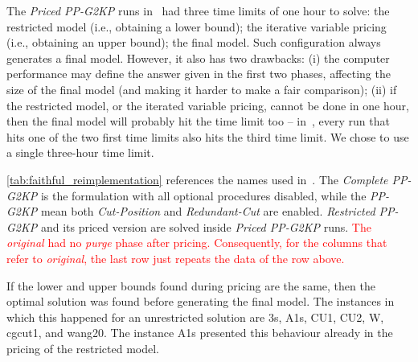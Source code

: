 \documentclass[smallextended]{svjour3}       %
\newif\iffinalversion
\newcommand{\oldtext}[1]{\iffinalversion%
#1%
\else%
\textcolor{red}{#1}%
\fi%
}
\begin{document}
The \emph{Priced PP-G2KP} runs in~\cite{furini:2016,dimitri_thesis} had three time limits of one hour to solve: the restricted model (i.e., obtaining a lower bound); the iterative variable pricing (i.e., obtaining an upper bound); the final model.
Such configuration always generates a final model.
However, it also has two drawbacks:
(i) the computer performance may define the answer given in the first two phases, affecting the size of the final model (and making it harder to make a fair comparison);
(ii) if the restricted model, or the iterated variable pricing, cannot be done in one hour, then the final model will probably hit the time limit too -- in~\cite{furini:2016}, every run that hits one of the two first time limits also hits the third time limit.
We chose to use a single three-hour time limit.

\autoref{tab:faithful_reimplementation} references the names used in~\cite{furini:2016,dimitri_thesis}.
The \emph{Complete PP-G2KP} is the formulation with all optional procedures disabled, while the \emph{PP-G2KP} mean both \emph{Cut-Position} and \emph{Redundant-Cut} are enabled.
\emph{Restricted PP-G2KP} and its priced version are solved inside \emph{Priced PP-G2KP} runs. \oldtext{The \emph{original} had no \emph{purge} phase after pricing. Consequently, for the columns that refer to \emph{original}, the last row just repeats the data of the row above.}
If the lower and upper bounds found during pricing are the same, then the optimal solution was found before generating the final model.
The instances in which this happened for an unrestricted solution are 3s, A1s, CU1, CU2, W, cgcut1, and wang20.
The instance A1s presented this behaviour already in the pricing of the restricted model.
\end{document}
